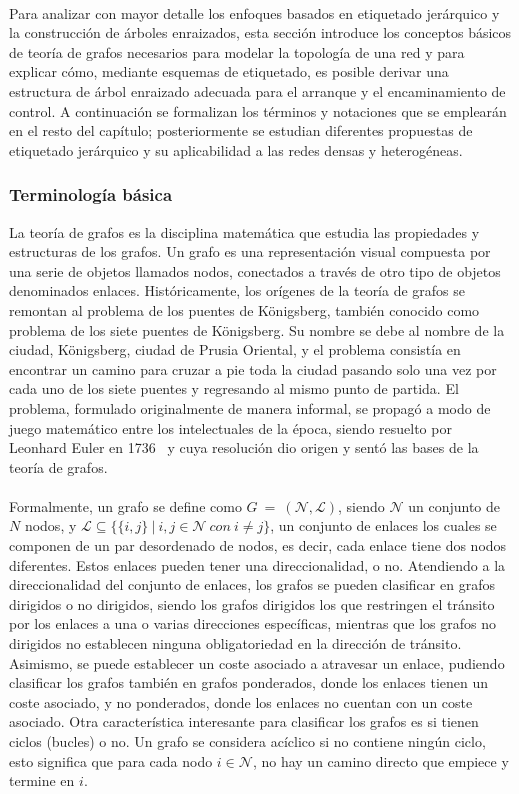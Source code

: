 \\
Para analizar con mayor detalle los enfoques basados en etiquetado jerárquico y la construcción de árboles enraizados, esta sección introduce los conceptos básicos de teoría de grafos necesarios para modelar la topología de una red y para explicar cómo, mediante esquemas de etiquetado, es posible derivar una estructura de árbol enraizado adecuada para el arranque y el encaminamiento de control. A continuación se formalizan los términos y notaciones que se emplearán en el resto del capítulo; posteriormente se estudian diferentes propuestas de etiquetado jerárquico y su aplicabilidad a las redes densas y heterogéneas.  

\subsubsection{Terminología básica}
\label{subsubsec:teminologia_grafos}
La teoría de grafos es la disciplina matemática que estudia las propiedades y estructuras de los grafos. Un grafo es una representación visual compuesta por una serie de objetos llamados nodos, conectados a través de otro tipo de objetos denominados enlaces. Históricamente, los orígenes de la teoría de grafos se remontan al problema de los puentes de Königsberg, también conocido como problema de los siete puentes de Königsberg. Su nombre se debe al nombre de la ciudad, Königsberg, ciudad de Prusia Oriental, y el problema consistía en encontrar un camino para cruzar a pie toda la ciudad pasando solo una vez por cada uno de los siete puentes y regresando al mismo punto de partida. El problema, formulado originalmente de manera informal, se propagó a modo de juego matemático entre los intelectuales de la época, siendo resuelto por Leonhard Euler en 1736~\cite{euler1741solutio} y cuya resolución dio origen  y sentó las bases de la teoría de grafos.\\
\\
Formalmente, un grafo se define como $G \: = \: (\mathcal{N}, \mathcal{L})$, siendo  $\mathcal{N}$ un conjunto de $N$ nodos, y $\mathcal{L} \subseteq \{\{i,j\} \: | \: i,j \in \mathcal{N} \: con \: i \neq j\}$, un conjunto de enlaces los cuales se componen de un par desordenado de nodos, es decir, cada enlace tiene dos nodos diferentes. Estos enlaces pueden tener una direccionalidad, o no.  Atendiendo a la direccionalidad del conjunto de enlaces, los grafos se pueden clasificar en grafos dirigidos o no dirigidos, siendo los grafos dirigidos los que restringen el tránsito por los enlaces a una o varias direcciones específicas, mientras que los grafos no dirigidos no establecen ninguna obligatoriedad en la dirección de tránsito. Asimismo, se puede establecer un coste asociado a atravesar un enlace, pudiendo clasificar los grafos también en grafos ponderados, donde los enlaces tienen un coste asociado, y no ponderados, donde los enlaces no cuentan con un coste asociado. Otra característica interesante para clasificar los grafos es si tienen ciclos (bucles) o no. Un grafo se considera acíclico si no contiene ningún ciclo, esto significa que para cada nodo $i \in \mathcal{N}$, no hay un camino directo que empiece y termine en $i$.\\
